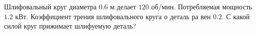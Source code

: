 Шлифовальный круг диаметра $0.6$ м делает $120$ об/мин. Потребляемая 
мощность $1.2$ кВт. Коэффициент трения шлифовального круга о деталь ра
вен $0.2$. С какой силой круг прижимает шлифуемую деталь?
